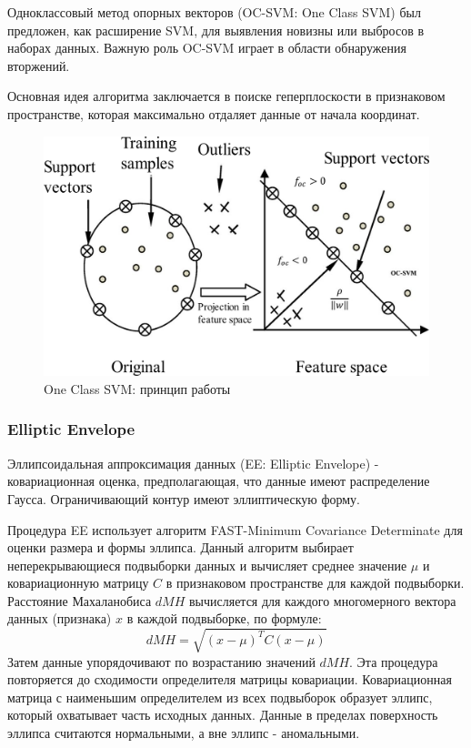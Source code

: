 \documentclass[12pt]{article}
\begin{document}
    \par Одноклассовый метод опорных векторов (OC-SVM: One Class SVM) был предложен, как расширение SVM, для выявления новизны или выбросов в наборах данных. Важную роль OC-SVM играет в области обнаружения вторжений. \\

    \par Основная идея алгоритма заключается в поиске геперплоскости в признаковом пространстве, которая максимально отдаляет данные от начала координат. \\

    \begin{figure}[h]
        \centering
        \includegraphics[width=0.5\linewidth]{OneClassSVM.png}
        \caption{One Class SVM: принцип работы}
        \label{sec:Research:Model:OneClassSVM:fig:OneClassSVM}
    \end{figure}


    \subsubsection{Elliptic Envelope}
    \label{sec:Research:Model:EllipticEnvelope}

    \par Эллипсоидальная аппроксимация данных (EE: Elliptic Envelope) - ковариационная оценка, предполагающая, что данные имеют распределение Гаусса. Ограничивающий контур имеют эллиптическую форму. \\

    \par Процедура EE использует алгоритм FAST-Minimum Covariance Determinate для оценки размера и формы эллипса. Данный алгоритм выбирает неперекрывающиеся подвыборки данных и вычисляет среднее значение $\mu$ и ковариационную матрицу $C$ в признаковом пространстве для каждой подвыборки. Расстояние Махаланобиса $dMH$ вычисляется для каждого многомерного вектора данных (признака) $x$ в каждой подвыборке, по формуле:
    $$
    dMH = \sqrt{(x-\mu)^T C (x-\mu)}
    $$
    \noindent Затем данные упорядочивают по возрастанию значений $dMH$. Эта процедура повторяется до сходимости определителя матрицы ковариации. Ковариационная матрица с наименьшим определителем из всех подвыборок образует эллипс, который охватывает часть исходных данных. Данные в пределах поверхность эллипса считаются нормальными, а вне эллипс - аномальными.
\end{document}
